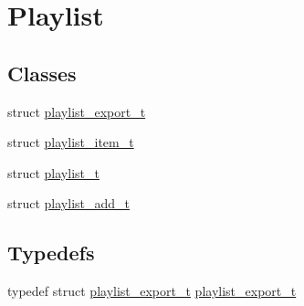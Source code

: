 \hypertarget{group__vlc__playlist}{}\section{Playlist}
\label{group__vlc__playlist}
\subsection*{Classes}
\begin{DoxyCompactItemize}
\item 
struct \hyperlink{structplaylist__export__t}{playlist\+\_\+export\+\_\+t}
\item 
struct \hyperlink{structplaylist__item__t}{playlist\+\_\+item\+\_\+t}
\item 
struct \hyperlink{structplaylist__t}{playlist\+\_\+t}
\item 
struct \hyperlink{structplaylist__add__t}{playlist\+\_\+add\+\_\+t}
\end{DoxyCompactItemize}
\subsection*{Typedefs}
\begin{DoxyCompactItemize}
\item 
typedef struct \hyperlink{structplaylist__export__t}{playlist\+\_\+export\+\_\+t} \hyperlink{group__vlc__playlist_ga6b0ee051ff356a72cbf0f35bf3089938}{playlist\+\_\+export\+\_\+t}
\end{DoxyCompactItemize}
